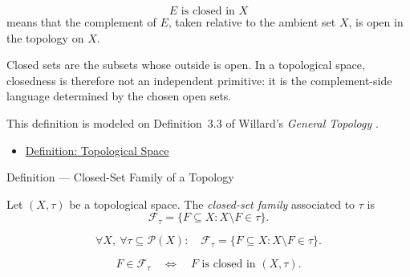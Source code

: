 \begin{remark*}
\[
E\text{ is closed in }X
\]
means that the complement of \(E\), taken relative to the ambient set \(X\),
is open in the topology on \(X\).
\end{remark*}

\begin{remark*}[Interpretation]
Closed sets are the subsets whose outside is open.  In a topological space,
closedness is therefore not an independent primitive: it is the complement-side
language determined by the chosen open sets.
\end{remark*}

\begin{remark*}
This definition is modeled on Definition~3.3 of Willard's
\emph{General Topology} \cite{WillardGeneralTopology}.
\end{remark*}


\begin{dependencies}
\begin{itemize}
  \item \hyperref[def:topological-space]{Definition: Topological Space}
\end{itemize}
\end{dependencies}

\begin{definitionbox}{Definition --- Closed-Set Family of a Topology}
\begin{definition}\label{def:closed-set-family-of-topology}
Let \((X,\tau)\) be a topological space.  The \emph{closed-set family}
associated to \(\tau\) is
\[
\mathcal{F}_{\tau}
=
\{F\subseteq X:X\setminus F\in\tau\}.
\]
\end{definition}
\end{definitionbox}

\begin{remark*}
\[
\forall X,\ \forall\tau\subseteq\mathcal{P}(X){:}\quad
\mathcal{F}_{\tau}
=
\{F\subseteq X:X\setminus F\in\tau\}.
\]
\end{remark*}

\begin{remark*}
\[
F\in\mathcal{F}_{\tau}
\quad\Longleftrightarrow\quad
F\text{ is closed in }(X,\tau).
\]
\end{remark*}

